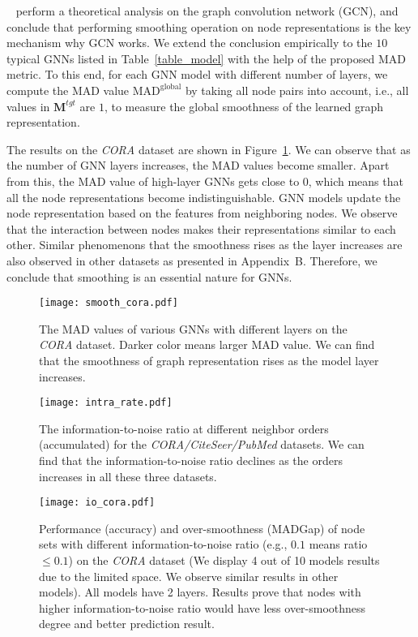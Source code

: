 \documentclass[letterpaper]{article} \usepackage{aaai20}  \usepackage{times}  \usepackage{helvet} \usepackage{courier}  \usepackage[hyphens]{url}  \usepackage{graphicx} \urlstyle{rm} \def\UrlFont{\rm}  \frenchspacing  \setlength{\pdfpagewidth}{8.5in}  \setlength{\pdfpageheight}{11in}  \setcounter{secnumdepth}{0}
\newcommand{\citet}[1]{\citeauthor{#1}~\shortcite{#1}}
\begin{document}
\citet{analysis_smoothing} perform a theoretical analysis on the graph convolution network (GCN), and conclude that performing smoothing operation on node representations is the key mechanism why GCN works.
We extend the conclusion empirically to the $10$ typical GNNs listed in Table~\ref{table_model} with the help of the proposed MAD metric.
To this end, for each GNN model with different number of layers, we compute the MAD value $\mathrm{MAD^{global}}$ by taking all node pairs into account, i.e., all values in $\bm{M}^{tgt}$ are $1$, to measure the global smoothness of the learned graph representation.

The results on the \textit{CORA} dataset are shown in Figure~\ref{figure_smooth_pattern}. We can observe that as the number of GNN layers increases, the MAD values become smaller. 
Apart from this, the MAD value of high-layer GNNs gets close to $0$, which means that all the node representations become indistinguishable. 
GNN models update the node representation based on the features from neighboring nodes. We observe that the interaction between nodes makes their representations similar to each other. 
Similar phenomenons that the smoothness rises as the layer increases are also observed in other datasets as presented in Appendix~B. Therefore, we conclude that smoothing is an essential nature for GNNs. 




\begin{figure}[t]
\centering
\texttt{[image: smooth\_cora.pdf]}
\caption{The MAD values of various GNNs with different layers on the \textit{CORA} dataset. Darker color means larger MAD value. We can find that the smoothness of graph representation rises as the model layer increases.}
\label{figure_smooth_pattern}
\end{figure}
\begin{figure}
\centering
\texttt{[image: intra\_rate.pdf]}
\caption{The information-to-noise ratio at different neighbor orders (accumulated) for the \textit{CORA/CiteSeer/PubMed} datasets. We can find that the information-to-noise ratio declines as the orders increases in all these three datasets.}
\label{figure_type_order}
\end{figure}


\begin{figure*}
\centering
\texttt{[image: io\_cora.pdf]}
\caption{Performance (accuracy) and over-smoothness (MADGap) of node sets with different information-to-noise ratio (e.g., $0.1$ means ratio$\le0.1$) on the \textit{CORA} dataset (We display 4 out of 10 models results due to the limited space. We observe similar results in other models). All models have 2 layers. Results prove that nodes with higher information-to-noise ratio would have less over-smoothness degree and better prediction result.}
\label{figure_info_noise}
\end{figure*}
\end{document}
